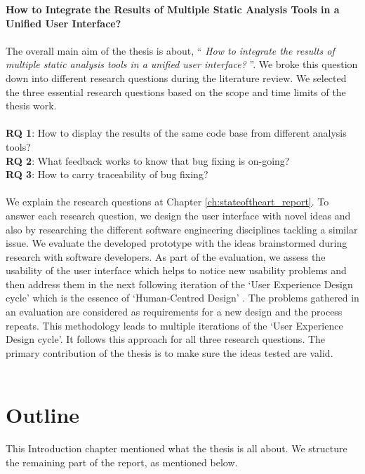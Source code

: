 \textbf{How to Integrate the Results of Multiple Static Analysis Tools in a Unified User Interface?}
\\ \\
The overall main aim of the thesis is about, “ \textit{How to integrate the results of multiple static analysis tools in a unified user interface?} ”. We broke this question down into different research questions during the literature review. We selected the three essential research questions based on the scope and time limits of the thesis work. \\ \\

\noindent\textbf{RQ 1}: How to display the results of the same code base from different analysis tools? \\
\textbf{RQ 2}: What feedback works to know that bug fixing is on-going? \\
\textbf{RQ 3}: How to carry traceability of bug fixing? \\ \\

We explain the research questions at Chapter \ref{ch:stateoftheart_report}. To answer each research question, we design the user interface with novel ideas and also by researching the different software engineering disciplines tackling a similar issue. We evaluate the developed prototype with the ideas brainstormed during research with software developers. As part of the evaluation, we assess the usability \cite{usability} of the user interface which helps to notice new usability problems and then address them in the next following iteration of the ‘User Experience Design cycle’ \cite{UXD} which is the essence of ‘Human-Centred Design’ \cite{hcd}. The problems gathered in an evaluation are considered as requirements for a new design and the process repeats. This methodology leads to multiple iterations of the ‘User Experience Design cycle’. It follows this approach for all three research questions. The primary contribution of the thesis is to make sure the ideas tested are valid. \\ \\



\section{Outline}

This Introduction chapter mentioned what the thesis is all about. We structure the remaining part of the report, as mentioned below. \\ \\


